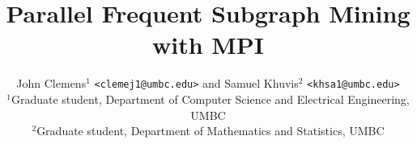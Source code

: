 \documentclass{article}
\title{Parallel Frequent Subgraph Mining with MPI}
\author{John Clemens$^1$ \texttt{<clemej1@umbc.edu>} and Samuel Khuvis$^2$ \texttt{<khsa1@umbc.edu>}\\
	$^1$Graduate student, Department of Computer Science and Electrical Engineering, UMBC\\
	$^2$Graduate student, Department of Mathematics and Statistics, UMBC}
\begin{document}
\maketitle










{}

%
\end{document}
